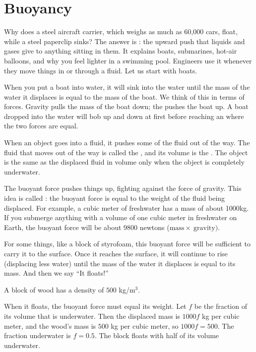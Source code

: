 \chapter{Buoyancy}

Why does a steel aircraft carrier, which weighs as much as 60,000 cars, float, while a steel paperclip sinks? The answer is : the upward push that liquids and gases give to anything sitting in them. It explains boats, submarines, hot-air balloons, and why you feel lighter in a swimming pool. Engineers use it whenever they move things in or through a fluid. Let us start with boats.

When you put a boat into water, it will sink into the water until
the mass of the water it displaces is equal to the mass of the
boat. We think of this in terms of forces. Gravity pulls the mass of
the boat down; the  pushes the boat up. A boat
dropped into the water will bob up and down at first before reaching an
 where the two forces are equal.

When an object goes into a fluid, it pushes some of the fluid out of the way. The fluid that moves out of the way is called the , and its volume is the . The object is the same as the displaced fluid in volume only when the object is completely underwater.

The buoyant force pushes things up, fighting against the force of
gravity. This idea is called : the buoyant force is equal to the weight of the fluid being
displaced. For example, a cubic meter of freshwater has a mass of
about 1000kg. If you submerge anything with a volume of one cubic meter in
freshwater on Earth, the buoyant force will be about 9800 newtons ($\text{mass} \times \ \text{gravity})$.

For some things, like a block of styrofoam, this buoyant force will be
sufficient to carry it to the surface. Once it reaches the surface, it
will continue to rise (displacing less water) until the mass of the
water it displaces is equal to its mass. And then we say ``It floats!''

\begin{Worked}
\begin{Problem}
A block of wood has a density of $500$ kg/m$^3$.
\end{Problem}
\begin{Solution}
When it floats, the buoyant force must equal its weight. Let $f$ be the fraction of its volume that is underwater. Then the displaced mass is $1000 f$ kg per cubic meter, and the wood's mass is $500$ kg per cubic meter, so $1000 f = 500$. The fraction underwater is $f = 0.5$. The block floats with half of its volume underwater.
\end{Solution}
\end{Worked}

